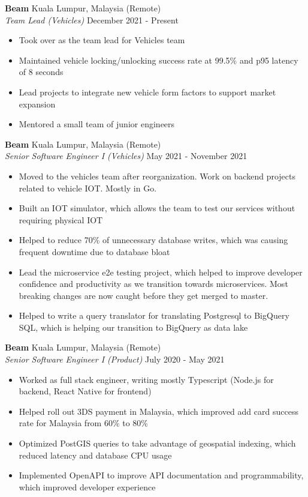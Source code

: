\documentclass[a4paper]{article}
\begin{document}
\textbf{Beam} \hfill Kuala Lumpur, Malaysia (Remote)\\
\textit{Team Lead (Vehicles)} \hfill December 2021 - Present\\
\vspace{-1mm}
\begin{itemize} \itemsep 1pt
	\item Took over as the team lead for Vehicles team
	\item Maintained vehicle locking/unlocking success rate at 99.5\% and p95 latency of 8 seconds
	\item Lead projects to integrate new vehicle form factors to support market expansion
	\item Mentored a small team of junior engineers
\end{itemize}
\textbf{Beam} \hfill Kuala Lumpur, Malaysia (Remote)\\
\textit{Senior Software Engineer I (Vehicles)} \hfill May 2021 - November 2021\\
\vspace{-1mm}
\begin{itemize} \itemsep 1pt
	\item Moved to the vehicles team after reorganization. Work on backend projects related to vehicle IOT. Mostly in Go.
	\item Built an IOT simulator, which allows the team to test our services without requiring physical IOT
	\item Helped to reduce 70\% of unnecessary database writes, which was causing frequent downtime due to database bloat
	\item Lead the microservice e2e testing project, which helped to improve developer confidence and productivity as we transition towards microservices. Most breaking changes are now caught before they get merged to master.
	\item Helped to write a query translator for translating Postgresql to BigQuery SQL, which is helping our transition to BigQuery as data lake
\end{itemize}
\textbf{Beam} \hfill Kuala Lumpur, Malaysia (Remote)\\
\textit{Senior Software Engineer I (Product)} \hfill July 2020 - May 2021\\
\vspace{-1mm}
\begin{itemize} \itemsep 1pt
	\item Worked as full stack engineer, writing mostly Typescript (Node.js for backend, React Native for frontend)
	\item Helped roll out 3DS payment in Malaysia, which improved add card success rate for Malaysia from 60\% to 80\%
	\item Optimized PostGIS queries to take advantage of geospatial indexing, which reduced latency and database CPU usage
	\item Implemented OpenAPI to improve API documentation and programmability, which improved developer experience
\end{itemize}
\end{document}
